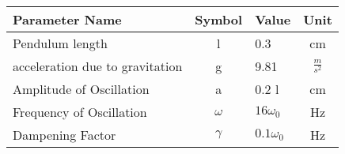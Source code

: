 \begin{tabular}{lclc}
\hline
 Parameter Name                  &  Symbol  & Value            &      Unit       \\
\hline
 Pendulum length                 &    l     & 0.3              &       cm        \\
 acceleration due to gravitation &    g     & 9.81             & $\frac{m}{s^2}$ \\
 Amplitude of Oscillation        &    a     & 0.2 l            &       cm        \\
 Frequency of Oscillation        & $\omega$ & $16 \omega_{0}$  &       Hz        \\
 Dampening Factor                & $\gamma$ & $0.1 \omega_{0}$ &       Hz        \\
\hline
\end{tabular}